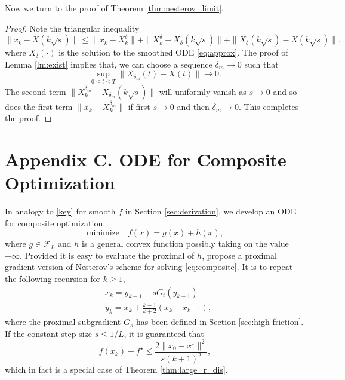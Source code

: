 \documentclass[twoside,11pt]{article}
\newcommand{\goto}{\rightarrow}
\begin{document}
Now we turn to the proof of Theorem \ref{thm:nesterov_limit}.
\begin{proof}
Note the triangular inequality
\[
\|x_k - X(k\sqrt{s})\| \le \|x_k - X^\delta_k\| + \|X^\delta_k - X_\delta(k\sqrt{s})\| + \|X_\delta(k\sqrt{s}) - X(k\sqrt{s})\|,
\]
where $X_\delta(\cdot)$ is the solution to the smoothed ODE \eqref{eq:approx}. The proof of Lemma \ref{lm:exist} implies that, we can choose a sequence $\delta_m \goto 0$ such that  
\[
\sup_{0 \le t \le T}\|X_{\delta_m}(t) - X(t)\| \goto 0.
\]
The second term $\|X^{\delta_m}_k - X_{\delta_m}(k\sqrt{s})\|$ will uniformly vanish as $s \goto 0$ and so does the first term $\|x_k - X^{\delta_m}_k\|$ if first $s \goto 0$ and then $\delta_m \goto 0$. This completes the proof.
\end{proof}






\section*{Appendix C. ODE for Composite Optimization}\label{app:c}
In analogy to \eqref{key} for smooth $f$ in Section \ref{sec:derivation}, we develop an ODE for composite optimization,
\begin{equation}\label{eq:composite}
\mbox{minimize} \quad f(x) = g(x) + h(x),
\end{equation}
where $g\in \mathcal{F}_{L}$ and $h$ is a general convex function
possibly taking on the value $+ \infty$. Provided it is easy to
evaluate the proximal of $h$, \citet{BeckTeboulle} propose a proximal
gradient version of Nesterov's scheme for solving
\eqref{eq:composite}. It is to repeat the following recursion for $k
\ge 1$,
\begin{equation}\nonumber
\begin{aligned}
&x_k = y_{k-1} -  s G_t(y_{k-1})\\
&y_k = x_k + \frac{k-1}{k+2}(x_k -x_{k-1}),
\end{aligned}
\end{equation}
where the proximal subgradient $G_s$ has been defined in Section \ref{sec:high-friction}. If the constant step size $s\le 1/L$, it is guaranteed that \citep{BeckTeboulle}
\[
f(x_k) - f^\star \le \frac{2\|x_0-x^\star\|^2}{s(k+1)^2},
\]
which in fact is a special case of Theorem \ref{thm:large_r_dis}.
\end{document}
